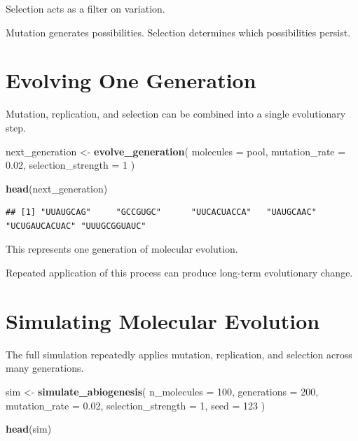\documentclass[
  oneside,
  openany]{book}
\newenvironment{Shaded}{\begin{snugshade}}{\end{snugshade}}
\newcommand{\AttributeTok}[1]{\textcolor[rgb]{0.13,0.29,0.53}{#1}}
\newcommand{\DecValTok}[1]{\textcolor[rgb]{0.00,0.00,0.81}{#1}}
\newcommand{\FloatTok}[1]{\textcolor[rgb]{0.00,0.00,0.81}{#1}}
\newcommand{\FunctionTok}[1]{\textcolor[rgb]{0.13,0.29,0.53}{\textbf{#1}}}
\newcommand{\NormalTok}[1]{#1}
\newcommand{\OtherTok}[1]{\textcolor[rgb]{0.56,0.35,0.01}{#1}}
\begin{document}
Selection acts as a filter on variation.

Mutation generates possibilities. Selection determines which possibilities persist.

\section{Evolving One Generation}\label{evolving-one-generation}

Mutation, replication, and selection can be combined into a single evolutionary step.

\begin{Shaded}
\begin{Highlighting}[]
\NormalTok{next\_generation }\OtherTok{\textless{}{-}} \FunctionTok{evolve\_generation}\NormalTok{(}
  \AttributeTok{molecules =}\NormalTok{ pool,}
  \AttributeTok{mutation\_rate =} \FloatTok{0.02}\NormalTok{,}
  \AttributeTok{selection\_strength =} \DecValTok{1}
\NormalTok{)}

\FunctionTok{head}\NormalTok{(next\_generation)}
\end{Highlighting}
\end{Shaded}

\begin{verbatim}
## [1] "UUAUGCAG"     "GCCGUGC"      "UUCACUACCA"   "UAUGCAAC"     "UCUGAUCACUAC" "UUUGCGGUAUC"
\end{verbatim}

This represents one generation of molecular evolution.

Repeated application of this process can produce long-term evolutionary change.

\section{Simulating Molecular Evolution}\label{simulating-molecular-evolution}

The full simulation repeatedly applies mutation, replication, and selection across many generations.

\begin{Shaded}
\begin{Highlighting}[]
\NormalTok{sim }\OtherTok{\textless{}{-}} \FunctionTok{simulate\_abiogenesis}\NormalTok{(}
  \AttributeTok{n\_molecules =} \DecValTok{100}\NormalTok{,}
  \AttributeTok{generations =} \DecValTok{200}\NormalTok{,}
  \AttributeTok{mutation\_rate =} \FloatTok{0.02}\NormalTok{,}
  \AttributeTok{selection\_strength =} \DecValTok{1}\NormalTok{,}
  \AttributeTok{seed =} \DecValTok{123}
\NormalTok{)}

\FunctionTok{head}\NormalTok{(sim)}
\end{Highlighting}
\end{Shaded}
\end{document}
